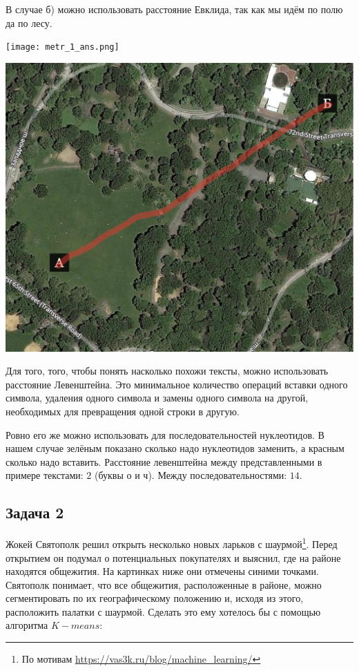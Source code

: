 \documentclass[12pt, a4paper, oneside]{article}
\begin{document}
{В случае б) можно использовать расстояние Евклида, так как мы идём по полю да по лесу. 
	
\begin{minipage}[t]{0.45\textwidth}
	\texttt{[image: metr\_1\_ans.png]}
\end{minipage}
\hfill
\begin{minipage}[t]{0.45\textwidth}
	\includegraphics[scale=0.12]{metr_2_ans.png}
\end{minipage}
	
Для того, того, чтобы понять насколько похожи тексты, можно использовать расстояние Левенштейна.  Это минимальное количество операций вставки одного символа, удаления одного символа и замены одного символа на другой, необходимых для превращения одной строки в другую. 

Ровно его же можно использовать для последовательностей нуклеотидов. В нашем случае зелёным показано сколько надо нуклеотидов заменить, а красным сколько надо вставить. Расстояние левенштейна между представленными в примере текстами: $2$ (буквы о и ч). Между последовательностями: $14$.
}


\subsection*{Задача 2}

Жокей Святополк решил открыть несколько новых ларьков с шаурмой\footnote{По мотивам \url{https://vas3k.ru/blog/machine_learning/}}. Перед открытием он подумал о потенциальных покупателях и выяснил, где на районе находятся общежития.  На картинках ниже они отмечены синими точками.  Святополк понимает, что все общежития, расположенные в районе, можно сегментировать по их географическому положению и, исходя из этого, расположить палатки с шаурмой. Сделать  это ему хотелось бы с помощью алгоритма $K-means$:
\end{document}

